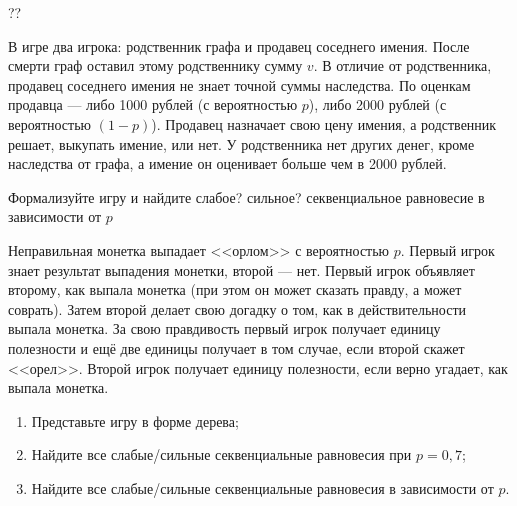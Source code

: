 \begin{problem}[Наследство]\par
\begin{source} \cite{slanthcev:gt}?? \end{source}
В игре два игрока: родственник графа и продавец соседнего имения. После смерти граф оставил этому родственнику сумму  $v$. В отличие от родственника, продавец соседнего имения не знает точной суммы наследства. По оценкам продавца --- либо 1000 рублей (с вероятностью  $p$), либо 2000 рублей (с вероятностью  $\left(1-p\right)$). Продавец назначает свою цену имения, а родственник решает, выкупать имение, или нет. У родственника нет других денег, кроме наследства от графа, а имение он оценивает больше чем в 2000 рублей. \par
 Формализуйте игру и найдите {\red слабое? сильное? секвенциальное} равновесие в зависимости от  $p$\par



\begin{sol}

\end{sol}
\end{problem}






\begin{problem} 
 Неправильная монетка выпадает <<орлом>> с вероятностью  $p$. Первый игрок знает результат выпадения монетки, второй --- нет. Первый игрок объявляет второму, как выпала монетка (при этом он может сказать правду, а может соврать). Затем второй делает свою догадку о том, как в действительности выпала монетка. За свою правдивость первый игрок получает единицу полезности и ещё две единицы получает в том случае, если второй скажет <<орел>>. Второй игрок получает единицу полезности, если верно угадает, как выпала монетка.\par
 \begin{enumerate}
\item Представьте игру в форме дерева;\par
\item Найдите все слабые/сильные секвенциальные равновесия при $p=0,7$;\par
\item Найдите все слабые/сильные секвенциальные равновесия в зависимости от $p$.
\end{enumerate}


\begin{sol}

\end{sol}
\end{problem}




